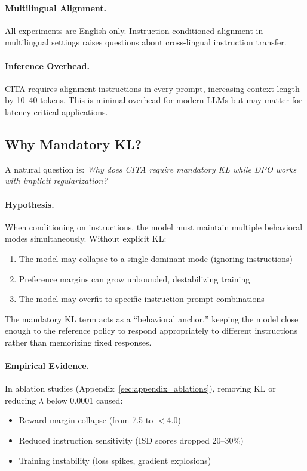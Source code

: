 \paragraph{Multilingual Alignment.} All experiments are English-only. Instruction-conditioned alignment in multilingual settings raises questions about cross-lingual instruction transfer.

\paragraph{Inference Overhead.} CITA requires alignment instructions in every prompt, increasing context length by 10--40 tokens. This is minimal overhead for modern LLMs but may matter for latency-critical applications.

\vspace{-2mm}
\subsection{Why Mandatory KL?}
\label{sec:why_kl}

A natural question is: \textit{Why does CITA require mandatory KL while DPO works with implicit regularization?}

\paragraph{Hypothesis.} When conditioning on instructions, the model must maintain multiple behavioral modes simultaneously. Without explicit KL:
\begin{enumerate}[leftmargin=*,itemsep=1pt]
    \item The model may collapse to a single dominant mode (ignoring instructions)
    \item Preference margins can grow unbounded, destabilizing training
    \item The model may overfit to specific instruction-prompt combinations
\end{enumerate}

The mandatory KL term acts as a ``behavioral anchor,'' keeping the model close enough to the reference policy to respond appropriately to different instructions rather than memorizing fixed responses.

\paragraph{Empirical Evidence.} In ablation studies (Appendix~\ref{sec:appendix_ablations}), removing KL or reducing $\lambda$ below 0.0001 caused:
\begin{itemize}[leftmargin=*,itemsep=1pt]
    \item Reward margin collapse (from 7.5 to $<$4.0)
    \item Reduced instruction sensitivity (ISD scores dropped 20--30\%)
    \item Training instability (loss spikes, gradient explosions)
\end{itemize}

